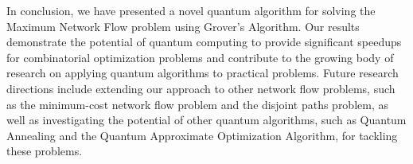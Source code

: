 In conclusion, we have presented a novel quantum algorithm for solving the Maximum Network Flow problem using Grover's Algorithm. Our results demonstrate the potential of quantum computing to provide significant speedups for combinatorial optimization problems and contribute to the growing body of research on applying quantum algorithms to practical problems. Future research directions include extending our approach to other network flow problems, such as the minimum-cost network flow problem and the disjoint paths problem, as well as investigating the potential of other quantum algorithms, such as Quantum Annealing and the Quantum Approximate Optimization Algorithm, for tackling these problems.

